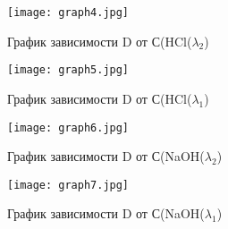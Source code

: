 \documentclass[a4paper,12pt]{article} %
\begin{document}
\begin{figure}[!h]
\begin{center}
\texttt{[image: graph4.jpg]}
    \begin{center}
    \caption{График зависимости D от С(HCl($\lambda_2$)}
    \end{center}
\end{center}
\end{figure}

\newpage

\begin{figure}[!h]
\begin{center}
\texttt{[image: graph5.jpg]}
    \begin{center}
    \caption{График зависимости D от С(HCl($\lambda_1$)}
    \end{center}
\end{center}
\end{figure}

\begin{figure}[!h]
\begin{center}
\texttt{[image: graph6.jpg]}
    \begin{center}
    \caption{График зависимости D от С(NaOH($\lambda_2$)}
    \end{center}
\end{center}
\end{figure}


\newpage

\begin{figure}[!h]
\begin{center}
\texttt{[image: graph7.jpg]}
    \begin{center}
    \caption{График зависимости D от С(NaOH($\lambda_1$)}
    \end{center}
\end{center}
\end{figure}
\end{document}
